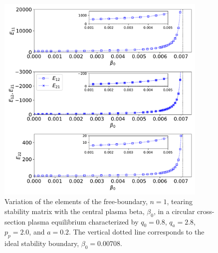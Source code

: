 \documentclass[12pt,prb,aps]{revtex4-1}
\begin{document}
\begin{figure}
\centerline{\includegraphics[width=0.9\textwidth]{Fig15.pdf}}
\caption{Variation of the elements of the free-boundary, $n=1$, tearing stability matrix with the central plasma beta, $\beta_0$, in a circular cross-section plasma equilibrium  characterized by $q_0=0.8$, $q_a= 2.8$, $p_p=2.0$, and
$a=0.2$. The vertical dotted line corresponds to the ideal stability boundary, $\beta_0=0.00708$. \label{fig15}}
\end{figure}
\end{document}
